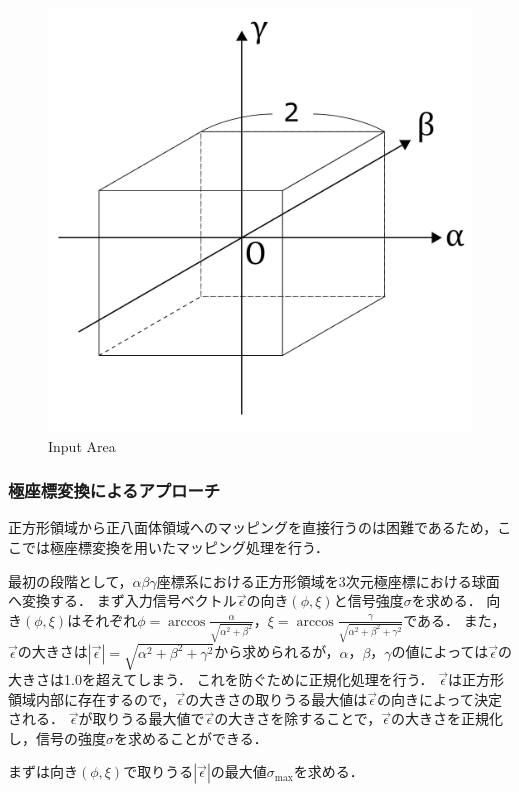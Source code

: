 \documentclass[../master]{subfiles}
\begin{document}
  \begin{figure}[h]
    \centering
    \includegraphics[width=80truemm, clip]{images/input.pdf}
    \caption{Input Area}
    \label{fig:input}
  \end{figure}

  \subsubsection{極座標変換によるアプローチ}

  正方形領域から正八面体領域へのマッピングを直接行うのは困難であるため，ここでは極座標変換を用いたマッピング処理を行う．

  最初の段階として，$\alpha\beta\gamma$座標系における正方形領域を3次元極座標における球面へ変換する．
  まず入力信号ベクトル$\vec{\epsilon}$の向き$(\phi, \xi)$と信号強度$\sigma$を求める．
  向き$(\phi, \xi)$はそれぞれ$\phi = \arccos{\frac{\alpha}{\sqrt{\alpha^2 + \beta^2}}}$，$\xi = \arccos{\frac{\gamma}{\sqrt{\alpha^2 + \beta^2 + \gamma^2}}}$である．
  また，$\vec{\epsilon}$の大きさは$|\vec{\epsilon}| = \sqrt{\alpha^2 + \beta^2 + \gamma^2}$から求められるが，$\alpha$，$\beta$，$\gamma$の値によっては$\vec{\epsilon}$の大きさは1.0を超えてしまう．
  これを防ぐために正規化処理を行う．
  $\vec{\epsilon}$は正方形領域内部に存在するので，$\vec{\epsilon}$の大きさの取りうる最大値は$\vec{\epsilon}$の向きによって決定される．
  $\vec{\epsilon}$が取りうる最大値で$\vec{\epsilon}$の大きさを除することで，$\vec{\epsilon}$の大きさを正規化し，信号の強度$\sigma$を求めることができる．

  まずは向き$(\phi, \xi)$で取りうる$|\vec{\epsilon}|$の最大値$\sigma_{\text{max}}$を求める．
\end{document}
